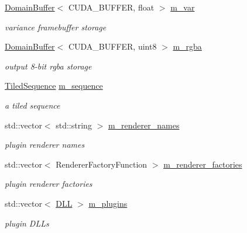 \begin{DoxyCompactItemize}
\hyperlink{class_domain_buffer}{Domain\+Buffer}$<$ C\+U\+D\+A\+\_\+\+B\+U\+F\+F\+ER, float $>$ \hyperlink{struct_rendering_context_impl_af5ac9b517fc9a57af475a4f9e808597b}{m\+\_\+var}
\begin{DoxyCompactList}\small\item\em variance framebuffer storage \end{DoxyCompactList}\item 
\mbox{\label{struct_rendering_context_impl_a34f297ac55dc2cc8f3e1d7e8a3ddd8cd}} 
\hyperlink{class_domain_buffer}{Domain\+Buffer}$<$ C\+U\+D\+A\+\_\+\+B\+U\+F\+F\+ER, uint8 $>$ \hyperlink{struct_rendering_context_impl_a34f297ac55dc2cc8f3e1d7e8a3ddd8cd}{m\+\_\+rgba}
\begin{DoxyCompactList}\small\item\em output 8-\/bit rgba storage \end{DoxyCompactList}\item 
\mbox{\label{struct_rendering_context_impl_a4981a9ed723e66fd6848a5a138d2a191}} 
\hyperlink{struct_tiled_sequence}{Tiled\+Sequence} \hyperlink{struct_rendering_context_impl_a4981a9ed723e66fd6848a5a138d2a191}{m\+\_\+sequence}
\begin{DoxyCompactList}\small\item\em a tiled sequence \end{DoxyCompactList}\item 
\mbox{\label{struct_rendering_context_impl_ad85c627c35d1d6652ff87790fc6d0146}} 
std\+::vector$<$ std\+::string $>$ \hyperlink{struct_rendering_context_impl_ad85c627c35d1d6652ff87790fc6d0146}{m\+\_\+renderer\+\_\+names}
\begin{DoxyCompactList}\small\item\em plugin renderer names \end{DoxyCompactList}\item 
\mbox{\label{struct_rendering_context_impl_a0927853d476eeda89f817a5379ea7470}} 
std\+::vector$<$ Renderer\+Factory\+Function $>$ \hyperlink{struct_rendering_context_impl_a0927853d476eeda89f817a5379ea7470}{m\+\_\+renderer\+\_\+factories}
\begin{DoxyCompactList}\small\item\em plugin renderer factories \end{DoxyCompactList}\item 
\mbox{\label{struct_rendering_context_impl_a2adf159a41b9613421cc480503168af0}} 
std\+::vector$<$ \hyperlink{struct_d_l_l}{D\+LL} $>$ \hyperlink{struct_rendering_context_impl_a2adf159a41b9613421cc480503168af0}{m\+\_\+plugins}
\begin{DoxyCompactList}\small\item\em plugin D\+L\+Ls \end{DoxyCompactList}\end{DoxyCompactItemize}


